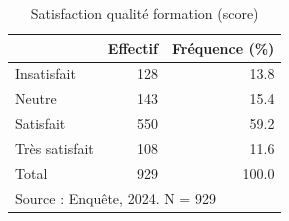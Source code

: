 \begin{table}[htbp]\centering
\def\sym#1{\ifmmode^{#1}\else\(^{#1}\)\fi}
\caption{Satisfaction qualité formation (score)}
\begin{tabular}{l*{2}{r}}
\toprule
            &    Effectif&Fréquence (\%)\\
\midrule
Insatisfait &         128&        13.8\\
Neutre      &         143&        15.4\\
Satisfait   &         550&        59.2\\
Très satisfait&         108&        11.6\\
Total       &         929&       100.0\\
\bottomrule
\multicolumn{3}{l}{\footnotesize Source : Enquête, 2024. N = 929}\\
\end{tabular}
\end{table}
